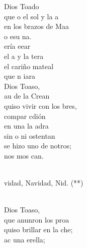 \begin{cancion}%
	 Dios Toado \\
	que o el sol y la a\\
	en los brazos de Maa \\
	o esu na.\\
	ería eear \\
	el a y la tera\\
	el cariño mateal \\
	que n  iara\\
\jump
	 Dios Toaso,\\
	au de la Crean\\
	quiso vivir con los bres,\\
	compar  cdión\\
	en una la adra \\
	sin o ni ostentan\\
	se hizo uno de notros;\\
	nos mos  can.  \\\jump\\
	\begin{chorus}%
	vidad, Navidad, Nid. (**)\\
	\end{chorus}%
	\jump\\
	 Dios Toaso, \\
	que anunron los proa\\
	quiso brillar en la che; \\
	  ac una erella;\\

\end{cancion}
